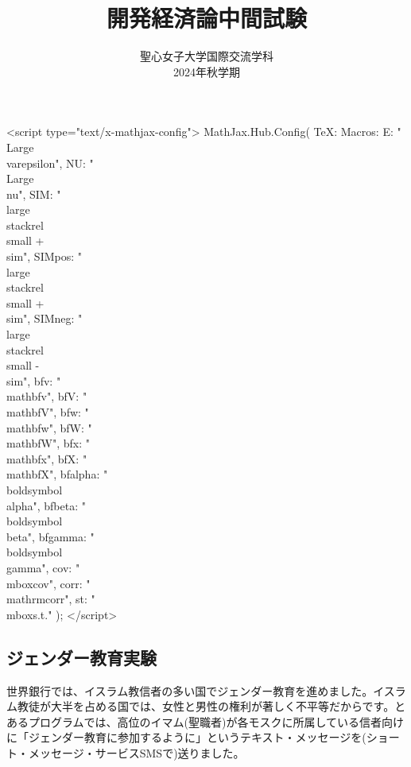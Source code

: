 \documentclass[
  letterpaper,
  DIV=11,
  numbers=noendperiod,
  oneside]{scrartcl}
\title{開発経済論中間試験}
\subtitle{聖心女子大学国際交流学科\\
2024年秋学期}
\author{}
\date{}
\begin{document}
\maketitle

<script type="text/x-mathjax-config">
MathJax.Hub.Config({
  TeX: {
    Macros: {
      E: "{\\Large\\varepsilon}",
      NU: "{\\Large\\nu}",
      SIM: "{\\large\\stackrel{\\small +}{\\sim}}",
      SIMpos: "{\\large\\stackrel{\\small +}{\\sim}}",
      SIMneg: "{\\large\\stackrel{\\small -}{\\sim}}",
      bfv: "{\\mathbf{v}}",
      bfV: "{\\mathbf{V}}",
      bfw: "{\\mathbf{w}}",
      bfW: "{\\mathbf{W}}",
      bfx: "{\\mathbf{x}}",
      bfX: "{\\mathbf{X}}",
      bfalpha: "{\\boldsymbol{\\alpha}}",
      bfbeta: "{\\boldsymbol{\\beta}}",
      bfgamma: "{\\boldsymbol{\\gamma}}",
      cov: "{\\mbox{cov}}",
      corr: "{\\mathrm{corr}}",
      st: "{\\mbox{s.t.}}"
    }
  }
});
</script>


\subsection{ジェンダー教育実験}\label{ux30b8ux30a7ux30f3ux30c0ux30fcux6559ux80b2ux5b9fux9a13}

世界銀行では、イスラム教信者の多い国でジェンダー教育を進めました。イスラム教徒が大半を占める国では、女性と男性の権利が著しく不平等だからです。とあるプログラムでは、高位のイマム(聖職者)が各モスクに所属している信者向けに「ジェンダー教育に参加するように」というテキスト・メッセージを(ショート・メッセージ・サービスSMSで)送りました。
\end{document}
